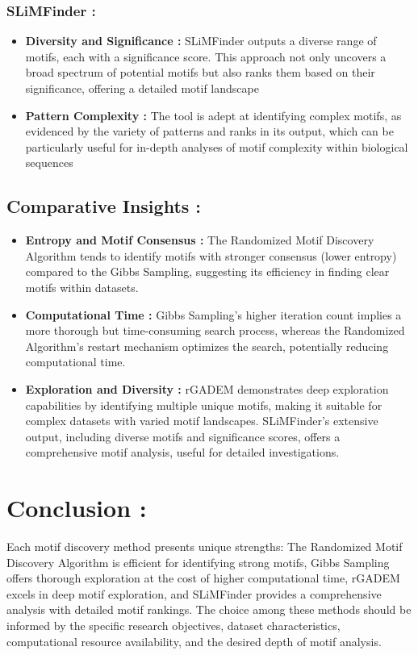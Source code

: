 \subsubsection{SLiMFinder : }
\begin{itemize}
    \item \textbf{Diversity and Significance : }SLiMFinder outputs a diverse range of motifs, each with a significance score. This approach not only uncovers a broad spectrum of potential motifs but also ranks them based on their significance, offering a detailed motif landscape
     \item \textbf{Pattern Complexity : }The tool is adept at identifying complex motifs, as evidenced by the variety of patterns and ranks in its output, which can be particularly useful for in-depth analyses of motif complexity within biological sequences
\end{itemize}

\subsection{Comparative Insights : }
\begin{itemize}
    \item \textbf{Entropy and Motif Consensus : }The Randomized Motif Discovery Algorithm tends to identify motifs with stronger consensus (lower entropy) compared to the Gibbs Sampling, suggesting its efficiency in finding clear motifs within datasets.
    \item \textbf{Computational Time : }Gibbs Sampling's higher iteration count implies a more thorough but time-consuming search process, whereas the Randomized Algorithm's restart mechanism optimizes the search, potentially reducing computational time.
    \item \textbf{Exploration and Diversity : }rGADEM demonstrates deep exploration capabilities by identifying multiple unique motifs, making it suitable for complex datasets with varied motif landscapes. SLiMFinder's extensive output, including diverse motifs and significance scores, offers a comprehensive motif analysis, useful for detailed investigations.
\end{itemize}

\section{Conclusion : }
Each motif discovery method presents unique strengths: The Randomized Motif Discovery Algorithm is efficient for identifying strong motifs, Gibbs Sampling offers thorough exploration at the cost of higher computational time, rGADEM excels in deep motif exploration, and SLiMFinder provides a comprehensive analysis with detailed motif rankings. The choice among these methods should be informed by the specific research objectives, dataset characteristics, computational resource availability, and the desired depth of motif analysis.